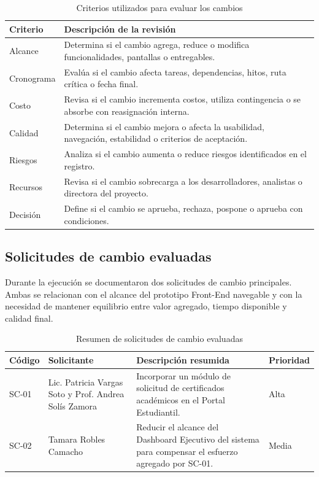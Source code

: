 \documentclass[11pt,spanish]{article}
\begin{document}
\begin{table}[H]
\centering
\caption{Criterios utilizados para evaluar los cambios}
\label{tab:criterios-evaluacion}
{\small
\begin{tabularx}{\textwidth}{p{3.5cm} Y}
\toprule
\textbf{Criterio} & \textbf{Descripción de la revisión} \\
\midrule
Alcance & Determina si el cambio agrega, reduce o modifica funcionalidades, pantallas o entregables. \\
Cronograma & Evalúa si el cambio afecta tareas, dependencias, hitos, ruta crítica o fecha final. \\
Costo & Revisa si el cambio incrementa costos, utiliza contingencia o se absorbe con reasignación interna. \\
Calidad & Determina si el cambio mejora o afecta la usabilidad, navegación, estabilidad o criterios de aceptación. \\
Riesgos & Analiza si el cambio aumenta o reduce riesgos identificados en el registro. \\
Recursos & Revisa si el cambio sobrecarga a los desarrolladores, analistas o directora del proyecto. \\
Decisión & Define si el cambio se aprueba, rechaza, pospone o aprueba con condiciones. \\
\bottomrule
\end{tabularx}
}
\end{table}

\subsection{Solicitudes de cambio evaluadas}

Durante la ejecución se documentaron dos solicitudes de cambio principales. Ambas se relacionan con el alcance del prototipo Front-End navegable y con la necesidad de mantener equilibrio entre valor agregado, tiempo disponible y calidad final.

\begin{table}[H]
\centering
\caption{Resumen de solicitudes de cambio evaluadas}
\label{tab:solicitudes-evaluadas}
{\small
\begin{tabularx}{\textwidth}{p{1.6cm} p{3cm} Y p{2.2cm}}
\toprule
\textbf{Código} & \textbf{Solicitante} & \textbf{Descripción resumida} & \textbf{Prioridad} \\
\midrule
SC-01 & Lic. Patricia Vargas Soto y Prof. Andrea Solís Zamora & Incorporar un módulo de solicitud de certificados académicos en el Portal Estudiantil. & Alta \\
SC-02 & Tamara Robles Camacho & Reducir el alcance del Dashboard Ejecutivo del sistema para compensar el esfuerzo agregado por SC-01. & Media \\
\bottomrule
\end{tabularx}
}
\end{table}
\end{document}
